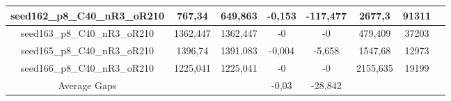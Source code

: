 \documentclass[a4paper]{article}
\begin{document}
\begin{center}
\begin{longtable}{cccccccc}
\hline
seed162\_p8\_C40\_nR3\_oR210 & 767,34 & 649,863 & -0,153 & -117,477 & 2677,3 & 91311\\
\hline
seed163\_p8\_C40\_nR3\_oR210 & 1362,447 & 1362,447 & -0 & -0 & 479,409 & 37203\\
\hline
seed165\_p8\_C40\_nR3\_oR210 & 1396,74 & 1391,083 & -0,004 & -5,658 & 1547,68 & 12973\\
\hline
seed166\_p8\_C40\_nR3\_oR210 & 1225,041 & 1225,041 & -0 & -0 & 2155,635 & 19199\\
\hline
\hline
Average Gaps & & & -0,03 & -28,842 & & \\
\hline
\hline
\end{longtable}
\end{center}
\end{document}
